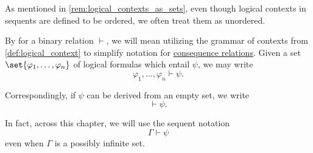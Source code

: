 \begin{remark}\label{rem:sequent_notation}
  As mentioned in \cref{rem:logical_contexts_as_sets}, even though logical contexts in sequents are defined to be ordered, we often treat them as unordered.

  By  for a binary relation \( \vdash \), we will mean utilizing the grammar of contexts from \cref{def:logical_context} to simplify notation for \hyperref[def:consequence_relation]{consequence relations}. Given a set \( \set{ \varphi_1, \ldots, \varphi_n } \) of logical formulas which entail \( \psi \), we may write
  \begin{equation*}
    \varphi_1, \ldots, \varphi_n \vdash \psi.
  \end{equation*}

  Correspondingly, if \( \psi \) can be derived from an empty set, we write
  \begin{equation*}
    \vdash \psi.
  \end{equation*}

  In fact, across this chapter, we will use the sequent notation
  \begin{equation*}
    \Gamma \vdash \psi
  \end{equation*}
  even when \( \Gamma \) is a possibly infinite set.
\end{remark}

